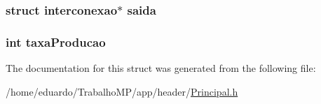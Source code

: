 \hypertarget{structgerador_aafa87c2fb8e43c550b83e0f109c2b7e5}{
\subsubsection[{saida}]{\setlength{\rightskip}{0pt plus 5cm}struct {\bf interconexao}$\ast$ saida}}\label{structgerador_aafa87c2fb8e43c550b83e0f109c2b7e5}
\hypertarget{structgerador_ac6d5c20bc66b992b34eaa1ab7bb1d813}{
\subsubsection[{taxa\-Producao}]{\setlength{\rightskip}{0pt plus 5cm}int taxa\-Producao}}\label{structgerador_ac6d5c20bc66b992b34eaa1ab7bb1d813}


The documentation for this struct was generated from the following file\-:\begin{DoxyCompactItemize}
\item 
/home/eduardo/\-Trabalho\-M\-P/app/header/\hyperlink{_principal_8h}{Principal.\-h}\end{DoxyCompactItemize}
